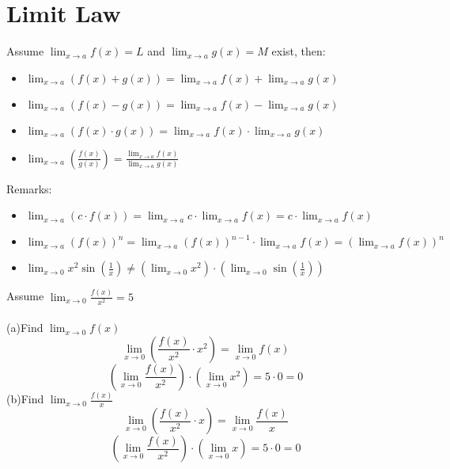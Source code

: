 \section{Limit Law}
Assume $\displaystyle \lim_{x \to a} f(x) = L$ and $\displaystyle \lim_{x \to a} g(x) = M$ exist, then:
\begin{itemize}
\item $\displaystyle \lim_{x \to a} (f(x) + g(x)) = \lim_{x \to a} f(x) + \lim_{x \to a} g(x)$
\item $\displaystyle \lim_{x \to a} (f(x) - g(x)) = \lim_{x \to a} f(x) - \lim_{x \to a} g(x)$
\item $\displaystyle \lim_{x \to a} (f(x) \cdot g(x)) = \lim_{x \to a} f(x) \cdot \lim_{x \to a} g(x)$
\item $\displaystyle \lim_{x \to a} (\frac{f(x)}{g(x)}) =  \frac{\displaystyle \lim_{x \to a} f(x)}{\displaystyle \lim_{x \to a} g(x)}$\\
\end{itemize}
Remarks:
\begin{itemize}
\item $\displaystyle \lim_{x \to a} (c \cdot f(x)) = \lim_{x \to a} c \cdot \lim_{x \to a} f(x) = c \cdot \lim_{x \to a} f(x)$
\item $\displaystyle \lim_{x \to a} (f(x))^n = \lim_{x \to a} (f(x))^{n - 1} \cdot \lim_{x \to a} f(x) = (\lim_{x \to a} f(x))^n$
\item $\displaystyle \lim_{x \to 0} x^2 \sin (\frac{1}{x}) \neq (\lim_{x \to 0} x^2) \cdot (\lim_{x \to 0} \sin (\frac{1}{x}))$
\end{itemize}
\begin{eg}
Assume $\displaystyle \lim_{x \to 0} \frac{f(x)}{x^2} =5$\\\\
(a)Find $\displaystyle \lim_{x \to 0} f(x)$\\
$$\displaystyle \lim_{x \to 0} (\frac{f(x)}{x^2} \cdot x^2) = \lim_{x \to 0} f(x)$$
$$\displaystyle (\lim_{x \to 0} \frac{f(x)}{x^2}) \cdot (\lim_{x \to 0} x^2) = 5 \cdot 0 = 0$$
(b)Find $\displaystyle \lim_{x \to 0} \frac{f(x)}{x}$\\
$$\displaystyle \lim_{x \to 0} (\frac{f(x)}{x^2} \cdot x) = \lim_{x \to 0} \frac{f(x)}{x}$$
$$\displaystyle (\lim_{x \to 0} \frac{f(x)}{x^2}) \cdot (\lim_{x \to 0} x) = 5 \cdot 0 = 0$$
\end{eg}

